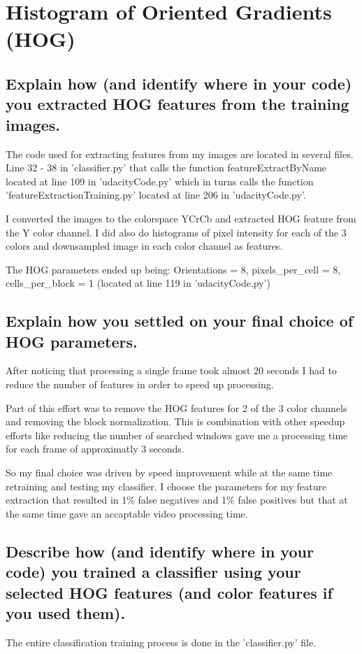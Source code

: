 \documentclass[12pt,a4paper]{article}
\begin{document}
\section{Histogram of Oriented Gradients (HOG)}
\subsection{Explain how (and identify where in your code) you extracted HOG features from the training images.}
The code used for extracting features from my images are located in several files. Line 32 - 38 in 'classifier.py' that calls the function featureExtractByName located at line 109 in 'udacityCode.py' which in turns calls the function 'featureExtractionTraining.py' located at line 206 in 'udacityCode.py'.

I converted the images to the colorspace YCrCb and extracted HOG feature from the Y color channel. I did also do histograms of pixel intensity for each of the 3 colors and downsampled image in each color channel as features.

The HOG parameters ended up being:
Orientations = 8, pixels\_per\_cell = 8, cells\_per\_block = 1 (located at line 119 in 'udacityCode.py')

\subsection{Explain how you settled on your final choice of HOG parameters.}
After noticing that processing a single frame took almost 20 seconds I had to reduce the number of features in order to speed up processing. 

Part of this effort was to remove the HOG features for 2 of the 3 color channels and removing the block normalization. This is combination with other speedup efforts like reducing the number of searched windows gave me a processing time for each frame of approximatly 3 seconds. 

So my final choice was driven by speed improvement while at the same time retraining and testing my classifier. I choose the parameters for my feature extraction that resulted in 1\% false negatives and 1\% false positives but that at the same time gave an accaptable video processing time.

\subsection{Describe how (and identify where in your code) you trained a classifier using your selected HOG features (and color features if you used them).}
The entire classification training process is done in the 'classifier.py' file. 
\end{document}
